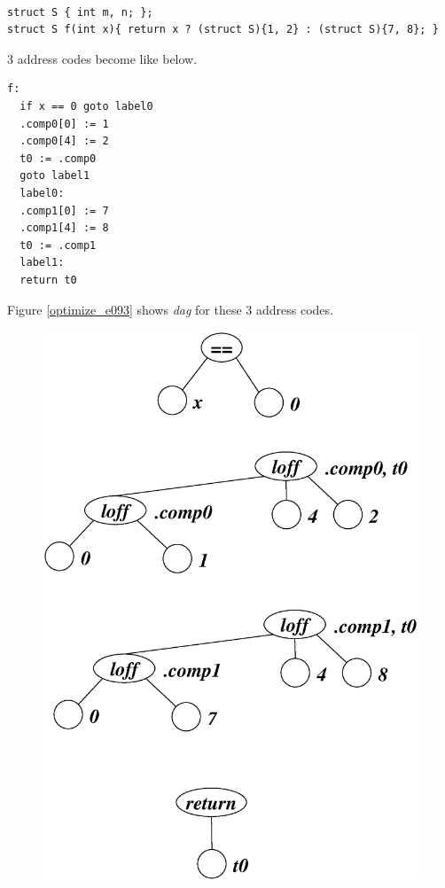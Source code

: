 \begin{Example}
\label{optimize_e092}
\begin{verbatim}

struct S { int m, n; };
struct S f(int x){ return x ? (struct S){1, 2} : (struct S){7, 8}; }
\end{verbatim}
3 address codes become like below.
\begin{verbatim}
f:
  if x == 0 goto label0
  .comp0[0] := 1
  .comp0[4] := 2
  t0 := .comp0
  goto label1
  label0:
  .comp1[0] := 7
  .comp1[4] := 8
  t0 := .comp1
  label1:
  return t0
\end{verbatim}
Figure \ref{optimize_e093} shows {\em dag} for these 3 address codes.
\begin{figure}[htbp]
\begin{center}
\includegraphics[width=1.0\linewidth,height=1.4\linewidth]{opt040.eps}

\end{center}
\end{figure}
\end{Example}
